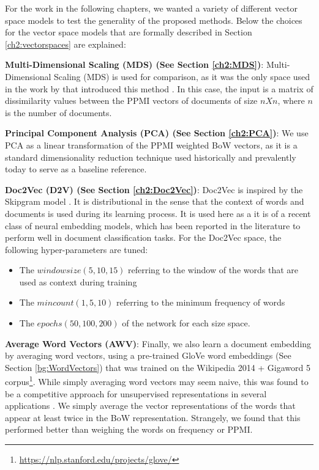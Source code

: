 For the work in the following chapters, we wanted a variety of different vector space models to test the generality of the proposed methods. Below the choices for the vector space models that are formally described in Section \ref{ch2:vectorspaces} are explained:

\textbf{Multi-Dimensional Scaling (MDS) (See Section \ref{ch2:MDS})}:  Multi-Dimensional Scaling (MDS) is used for comparison, as it was the only space used in the work by  that introduced this method  \cite{Derrac2015}. In this case, the input is a matrix of dissimilarity values between the PPMI vectors of documents of size  $n X n$, where $n$ is the number of documents.  %

\textbf{Principal Component Analysis (PCA) (See Section \ref{ch2:PCA})}: We use PCA as a linear transformation of the PPMI weighted BoW vectors, as it is a standard dimensionality reduction technique used historically and prevalently today to serve as a baseline reference.

\textbf{Doc2Vec (D2V) (See Section \ref{ch2:Doc2Vec})}: Doc2Vec is inspired by the Skipgram model \cite{DBLP:conf/icml/LeM14}.  It is distributional in the sense that the context of words and documents is used during its learning process. It is used here as a it is of a recent class of neural embedding models, which has been reported in the literature to perform well in document classification tasks. For the Doc2Vec space, the following hyper-parameters are tuned: 

\begin{itemize}
	\item The ${window size} (5, 10, 15)$ referring to the  window of the words that are used as context during training 
	\item The ${min count} (1, 5, 10)$ referring to the minimum frequency of words  
	\item The ${epochs} (50, 100, 200)$ of the network for each size space. 
\end{itemize}



\textbf{Average Word Vectors (AWV)}: Finally, we also learn a document embedding by averaging word vectors, using a pre-trained GloVe word embeddings (See Section \ref{bg:WordVectors}) that was trained on the Wikipedia 2014 + Gigaword 5 corpus\footnote{\url{https://nlp.stanford.edu/projects/glove/}}. While simply averaging word vectors may seem naive, this was found to be a competitive approach for unsupervised representations in several applications \cite{DBLP:conf/naacl/HillCK16}. We simply average the vector representations of the words that appear at least twice in the BoW representation. Strangely, we found that this performed better than weighing the words on frequency or PPMI.

